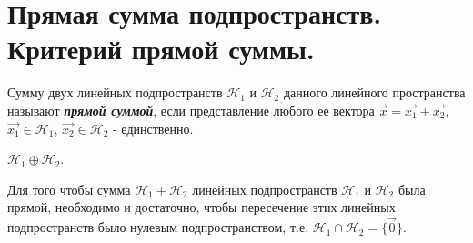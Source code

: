 \section{
    Прямая сумма подпространств. Критерий прямой суммы.
}

\begin{definition}
    Сумму двух линейных подпространств $\mathcal{H}_1$ и $\mathcal{H}_2$ данного линейного пространства называют \textbf{\textit{прямой суммой}}, если представление любого ее вектора $\vec{x} = \vec{x_1} + \vec{x_2}$, $\vec{x_1} \in \mathcal{H}_1$, $\vec{x_2} \in \mathcal{H}_2$ - единственно.
\end{definition}

\begin{designation}
    $\mathcal{H}_1 \oplus \mathcal{H}_2$.
\end{designation}

\begin{theorem}
    Для того чтобы сумма $\mathcal{H}_1 + \mathcal{H}_2$ линейных подпространств $\mathcal{H}_1$ и $\mathcal{H}_2$ была прямой, необходимо и достаточно, чтобы пересечение этих линейных подпространств было нулевым подпространством, т.е. $\mathcal{H}_1 \cap \mathcal{H}_2 = \{\vec{0}\}$.
\end{theorem}

